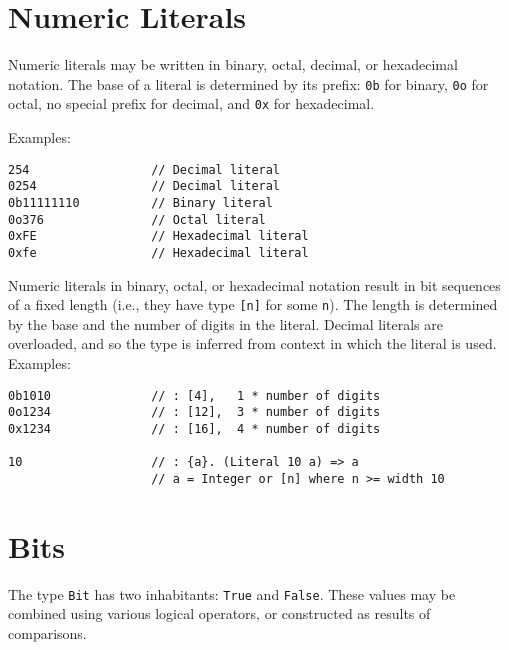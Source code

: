 \section{Numeric Literals}\label{numeric-literals}

Numeric literals may be written in binary, octal, decimal, or
hexadecimal notation. The base of a literal is determined by its prefix:
\texttt{0b} for binary, \texttt{0o} for octal, no special prefix for
decimal, and \texttt{0x} for hexadecimal.

Examples:

\begin{verbatim}
254                 // Decimal literal
0254                // Decimal literal
0b11111110          // Binary literal
0o376               // Octal literal
0xFE                // Hexadecimal literal
0xfe                // Hexadecimal literal
\end{verbatim}

Numeric literals in binary, octal, or hexadecimal notation result in bit
sequences of a fixed length (i.e., they have type \texttt{{[}n{]}} for
some \texttt{n}). The length is determined by the base and the number of
digits in the literal. Decimal literals are overloaded, and so the type
is inferred from context in which the literal is used. Examples:

\begin{verbatim}
0b1010              // : [4],   1 * number of digits
0o1234              // : [12],  3 * number of digits
0x1234              // : [16],  4 * number of digits

10                  // : {a}. (Literal 10 a) => a
                    // a = Integer or [n] where n >= width 10
\end{verbatim}

\section{Bits}\label{bits}

The type \texttt{Bit} has two inhabitants: \texttt{True} and
\texttt{False}. These values may be combined using various logical
operators, or constructed as results of comparisons.

